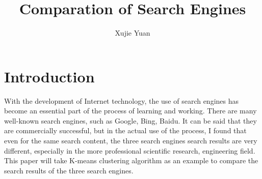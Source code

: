 \documentclass{article}
\title{Comparation of Search Engines}
\author{Xujie Yuan}
\begin{document}
    \maketitle
    \section{Introduction}
    With the development of Internet technology, the use of search engines has become an essential part of the process of learning and working. There are many well-known search engines, such as Google, Bing, Baidu. It can be said that they are commercially successful, but in the actual use of the process, I found that even for the same search content, the three search engines search results are very different, especially in the more professional scientific research, engineering field. This paper will take K-means clustering algorithm as an example to compare the search results of the three search engines.
\end{document}
